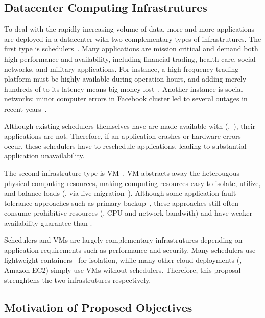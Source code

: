 \vspace{-.15in}\subsection{Datacenter Computing Infrastrutures}
\label{sec:datacenter}\vspace{-.075in}



To deal with the rapidly increasing volume of data, more and more applications 
are deployed in a datacenter with two complementary types of infrastrutures. The 
first type is schedulers~\cite{borg:eurosys15,mesos:nsdi11,tupperware, 
yarn:socc13, autopilot:sosp07,quincy:sosp09,apollo:osdi14,fuxi:vldb14}. Many 
applications are mission critical and demand both high performance
and availability, including financial trading, health care, social networks, 
and military applications. For instance, a high-frequency trading platform 
must be highly-available during operation hours, and adding merely hundreds of 
\us to its latency means big money lost~\cite{nosql:finance}. Another 
instance is social networks: minor computer errors in Facebook cluster led to 
several outages in recent years~\cite{facebook:outage}.


Although existing schedulers themselves have are made available with 
\paxos (\eg,~\cite{mesos:nsdi11}), their applications are not. Therefore, if an 
application crashes or hardware errors occur, these schedulers have to 
reschedule applications, leading to substantial application unavailability.

% 
The second infrastruture type is VM~\cite{amazon:ec2, openstack, vmware}. VM 
abstracts away the heterougous physical computing resources, making 
computing resources easy to isolate, utilize, and balance loads (\eg, 
via live migration~\cite{vmotion,xen:migration}). Although some application 
fault-tolerance approaches such as primary-backup~\cite{remus:nsdi08}, these 
approaches still often consume prohibitive resources (\eg, CPU and network 
bandwith) and have weaker availability guarantee than \paxos.

Schedulers and VMs are largely complementary infrastrutures depending on 
application requirements such as performance and security. Many schedulers 
use lightweight containers~\cite{docker,lxc} for isolation, while many other 
cloud deployments (\eg, Amazon EC2) simply use VMs without schedulers. 
Therefore, this proposal strenghtens the two infrastrutures respectively.


\vspace{-.15in}\subsection{Motivation of Proposed Objectives} 
\label{sec:motivation}\vspace{-.075in}

